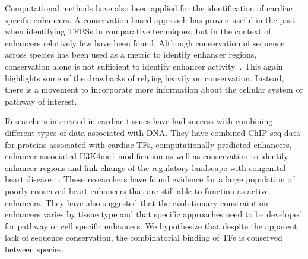 Computational methods have also been applied for the identification of cardiac specific enhancers. A conservation based approach has proven useful in the past when identifying TFBSs in comparative techniques, but in the context of enhancers relatively few have been found. Although conservation of sequence across species has been used as a metric to identify enhancer regions, conservation alone is not sufficient to identify enhancer activity~\cite{blow2010chip}. This again highlights some of the drawbacks of relying heavily on conservation. Instead, there is a movement to incorporate more information about the cellular system or pathway of interest. 
 
Researchers interested in cardiac tissues have had success with combining different types of data associated with DNA. They have combined ChIP-seq data for proteins associated with cardiac TFs, computationally predicted enhancers, enhancer associated H3K4me1 modification as well as conservation to identify enhancer regions and link change of the regulatory landscape with congenital heart disease ~\cite{smemo2012regulatory}. These researchers have found evidence for a large population of poorly conserved heart enhancers that are still able to function as active enhancers. They have also suggested that the evolutionary constraint on enhancers varies by tissue type and that specific approaches need to be developed for pathway or cell specific enhancers. We hypothesize that despite the apparent lack of sequence conservation, the combinatorial binding of TFs is conserved between species. 


       


   
